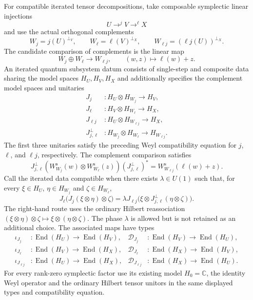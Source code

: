 \begin{definition}
For compatible iterated tensor decompositions, take composable symplectic
linear injections
\[
 U\mathrel{\mathop{\longrightarrow}^{j}}V
 \mathrel{\mathop{\longrightarrow}^{\ell}}X
\]
and use the actual orthogonal complements
\[
 W_j=j(U)^{\perp_V},\qquad
 W_\ell=\ell(V)^{\perp_X},\qquad
 W_{\ell j}=(\ell j(U))^{\perp_X}.
\]
The candidate comparison of complements is the linear map
\[
 W_j\oplus W_\ell\longrightarrow W_{\ell j},
 \qquad (w,z)\longmapsto\ell(w)+z.
\]
An iterated quantum subsystem datum consists of single-step and composite
data sharing the model spaces $H_U,H_V,H_X$ and additionally
specifies the complement model spaces and unitaries
\[
\begin{aligned}
 J_j&:H_U\otimes H_{W_j}\longrightarrow H_V,\\
 J_\ell&:H_V\otimes H_{W_\ell}\longrightarrow H_X,\\
 J_{\ell j}&:H_U\otimes H_{W_{\ell j}}\longrightarrow H_X,\\
 J^\perp_{j,\ell}&:H_{W_j}\otimes H_{W_\ell}
   \longrightarrow H_{W_{\ell j}}.
\end{aligned}
\]
The first three unitaries satisfy the preceding Weyl compatibility equation
for $j$, $\ell$, and $\ell j$, respectively. The complement comparison
satisfies
\[
 J^\perp_{j,\ell}
 (W^{\mathrm s}_{W_j}(w)\otimes W^{\mathrm s}_{W_\ell}(z))
 (J^\perp_{j,\ell})^*
 =W^{\mathrm s}_{W_{\ell j}}(\ell(w)+z).
\]
Call the iterated data compatible when there exists
$\lambda\in U(1)$ such that, for every
$\xi\in H_U$, $\eta\in H_{W_j}$ and $\zeta\in H_{W_\ell}$,
\[
 J_\ell\bigl(J_j(\xi\otimes\eta)\otimes\zeta\bigr)
 =\lambda J_{\ell j}
   \bigl(\xi\otimes J^\perp_{j,\ell}(\eta\otimes\zeta)\bigr).
\]
The right-hand route uses the ordinary Hilbert reassociation
$(\xi\otimes\eta)\otimes\zeta\mapsto
\xi\otimes(\eta\otimes\zeta)$. The phase $\lambda$ is allowed but is not
retained as an additional choice. The associated maps have types
\[
\begin{aligned}
 \iota_{J_j}&:\operatorname{End}(H_U)\to\operatorname{End}(H_V),&
 \mathcal D_{J_j}&:\operatorname{End}(H_V)\to\operatorname{End}(H_U),\\
 \iota_{J_\ell}&:\operatorname{End}(H_V)\to\operatorname{End}(H_X),&
 \mathcal D_{J_\ell}&:\operatorname{End}(H_X)\to\operatorname{End}(H_V),\\
 \iota_{J_{\ell j}}&:\operatorname{End}(H_U)\to\operatorname{End}(H_X),&
 \mathcal D_{J_{\ell j}}&:\operatorname{End}(H_X)\to\operatorname{End}(H_U).
\end{aligned}
\]
For every rank-zero symplectic factor use its existing model
$H_0=\mathbb C$, the identity Weyl operator and the ordinary Hilbert tensor
unitors in the same displayed types and compatibility equation.
\end{definition}

